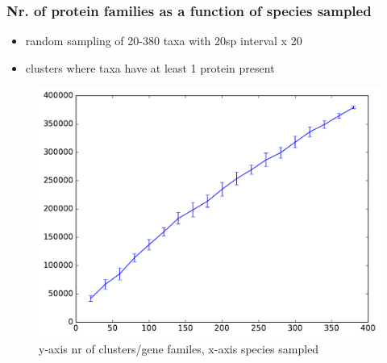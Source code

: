 \documentclass{beamer}
\begin{document}
\begin{frame}
\frametitle{Nr. of protein families as a function of species sampled}
\label{sec-7}

\begin{itemize}
\item random sampling of 20-380 taxa with 20sp interval x 20
\item clusters where taxa have at least 1 protein present
\end{itemize}
\begin{figure}[htb]
\centering
\includegraphics[width=.9\linewidth]{./gene_families_plotted.pdf}
\caption{y-axis nr of clusters/gene familes, x-axis species sampled}
\end{figure}
\end{frame}
\end{document}
